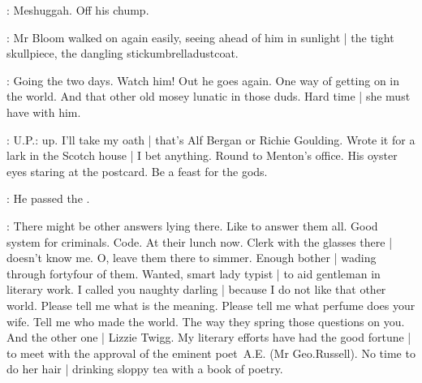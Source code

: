 \BloomInt:
Meshuggah.
Off his chump.

:
Mr Bloom walked on again easily,
seeing ahead of him in sunlight |
the tight skullpiece,
the dangling stickumbrelladustcoat.

\BloomInt:
Going the two days.
Watch him!
Out he goes again.
One way of getting on in the world.
And that other old mosey lunatic in those duds.
Hard time |
she must have with him.

\BloomInt:
U.P.:
up.
I'll take my oath |
that's Alf Bergan or Richie Goulding.
Wrote it for a lark in the Scotch house |
I bet anything.
Round to Menton's office.
His oyster eyes staring at the postcard.
Be a feast for the gods.

:
He passed the .

\BloomInt:
There might be other answers lying there.
Like to answer them all.
Good system for criminals.
Code.
At their lunch now.
Clerk with the glasses there |
doesn't know me.
O, leave them there to simmer.
Enough bother |
wading through fortyfour of them.
Wanted,
smart lady typist |
to aid gentleman in literary work.
I called you naughty darling |
because I do not like that other world.
Please tell me what is the meaning.
Please tell me what perfume does your wife.
Tell me who made the world.
The way they spring those questions on you.
And the other one |
Lizzie Twigg.
My literary efforts have had the good fortune |
to meet with the approval of the eminent poet~A.E.\@
(Mr Geo.\@ Russell).
No time to do her hair |
drinking sloppy tea with a book of poetry.

